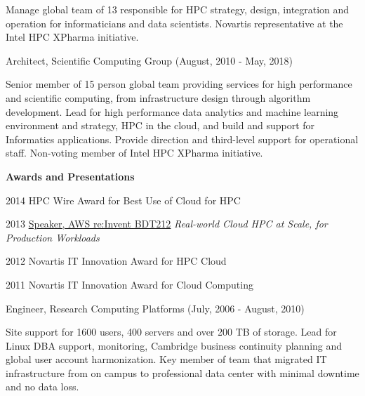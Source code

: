 \documentclass[11pt,article,oneside]{memoir}
\begin{document}
\ind \hspace{0.35in} \footnotesize Manage global team of 13 responsible for HPC strategy, design, integration and operation for informaticians and data scientists. Novartis representative at the Intel HPC XPharma initiative.

\medskip
\ind \footnotesize Architect, Scientific Computing Group (August, 2010 - May, 2018)


\ind \hspace{0.35in} \footnotesize Senior member of 15 person global team providing services for high performance and scientific computing, from infrastructure design through algorithm development. Lead for high performance data analytics and machine learning environment and strategy, HPC in the cloud, and build and support for Informatics applications. Provide direction and third-level support for operational staff. Non-voting member of Intel HPC XPharma initiative.

\medskip
\ind \hspace{0.35in} \footnotesize \textbf{Awards and Presentations}

\ind \hspace{0.35in} \footnotesize 2014 HPC Wire Award for Best Use of Cloud for HPC

\ind \hspace{0.35in} \footnotesize 2013 \href{https://www.youtube.com/watch?v=--ALfYpw_aM}{Speaker, AWS re:Invent BDT212} \emph{Real-world Cloud HPC at Scale, for Production Workloads}

\ind \hspace{0.35in} \footnotesize 2012 Novartis IT Innovation Award for HPC Cloud

\ind \hspace{0.35in} \footnotesize 2011 Novartis IT Innovation Award for Cloud Computing
\medskip

\ind \footnotesize Engineer, Research Computing Platforms (July, 2006 - August, 2010)

\ind \hspace{0.35in} \footnotesize Site support for 1600 users, 400 servers and over 200 TB of storage. Lead for Linux DBA support, monitoring, Cambridge business continuity planning and global user account harmonization. Key member of team that migrated IT infrastructure from on campus to professional data center with minimal downtime and no data loss.
\end{document}
